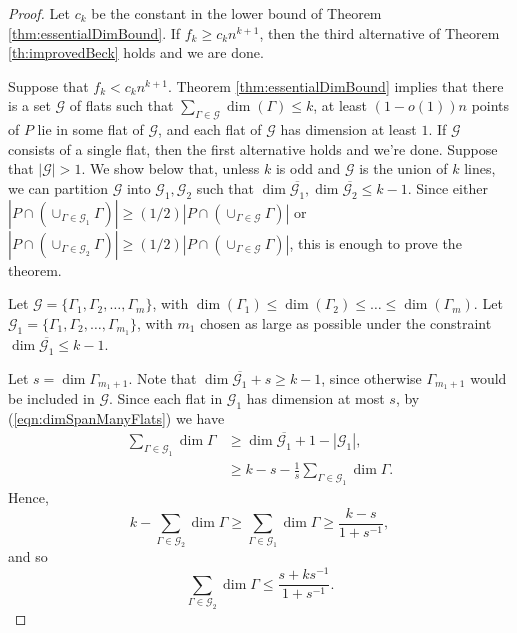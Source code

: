 \documentclass{article}
\begin{document}
\begin{proof}
	Let $c_k$ be the constant in the lower bound of Theorem \ref{thm:essentialDimBound}.
	If $f_k \geq c_k n^{k+1}$, then the third alternative of Theorem \ref{th:improvedBeck} holds and we are done.
	
Suppose that $f_k < c_k n^{k+1}$.
Theorem \ref{thm:essentialDimBound} implies that there is a set $\mathcal{G}$ of flats such that $\sum_{\Gamma \in \mathcal{G}} \dim(\Gamma) \leq k$, at least $(1-o(1))n$ points of $P$ lie in some flat of $\mathcal{G}$, and each flat of $\mathcal{G}$ has dimension at least $1$.
If $\mathcal{G}$ consists of a single flat, then the first alternative holds and we're done.
Suppose that $|\mathcal{G}| > 1$.
We show below that, unless $k$ is odd and $\mathcal{G}$ is the union of $k$ lines, we can partition $\mathcal{G}$ into $\mathcal{G}_1, \mathcal{G}_2$ such that $\dim \overline{\mathcal{G}_1}, \dim \overline{\mathcal{G}_2} \leq k-1$.
Since either $|P \cap (\cup_{\Gamma \in \mathcal{G}_1} \Gamma)| \geq (1/2)|P \cap (\cup_{\Gamma \in \mathcal{G}} \Gamma)|$ or $|P \cap (\cup_{\Gamma \in \mathcal{G}_2} \Gamma)| \geq (1/2) |P \cap (\cup_{\Gamma \in \mathcal{G}} \Gamma)|$, this is enough to prove the theorem.

Let $\mathcal{G} = \{\Gamma_1, \Gamma_2, \ldots, \Gamma_m\}$, with $\dim(\Gamma_1) \leq \dim(\Gamma_2) \leq \ldots \leq \dim(\Gamma_m)$.
Let $\mathcal{G}_1 = \{\Gamma_1, \Gamma_2, \ldots, \Gamma_{m_1}\}$, with $m_1$ chosen as large as possible under the constraint $\dim \overline{\mathcal{G}_1} \leq k-1$.

Let $s = \dim \Gamma_{m_1 + 1}$.
Note that $\dim \overline{\mathcal{G}_1} + s \geq k-1$, since otherwise $\Gamma_{m_1 + 1}$ would be included in $\mathcal{G}$.
Since each flat in $\mathcal{G}_1$ has dimension at most $s$, by (\ref{eqn:dimSpanManyFlats}) we have
\begin{align*}
\sum_{\Gamma \in \mathcal{G}_1} \dim \Gamma &\geq \dim \overline{\mathcal {G}_1} + 1 - |\mathcal{G}_1|, \\
&\geq k - s - \frac{1}{s}\sum_{\Gamma \in \mathcal{G}_1} \dim \Gamma.
\end{align*}
Hence,
$$k - \sum_{\Gamma \in \mathcal{G}_2} \dim \Gamma \geq \sum_{\Gamma \in \mathcal{G}_1} \dim \Gamma \geq \frac{k-s}{1 + s^{-1}},$$
and so
$$\sum_{\Gamma \in \mathcal{G}_2} \dim \Gamma \leq \frac{s + ks^{-1}}{1 + s^{-1}}.$$


\end{proof}
\end{document}
